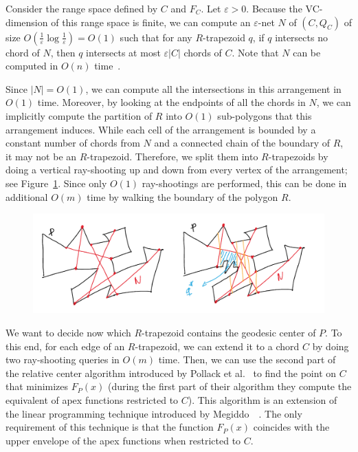 \documentclass[a4paper,UKenglish]{lipics}
\newcommand{\F}[2]{\ensuremath{F_{\scriptscriptstyle #1}(#2)}}
\begin{document}
Consider the range space defined by $C$ and $F_C$. 
Let $\varepsilon >0$.
Because the VC-dimension of this range space is finite, we can compute an $\varepsilon$-net $N$ of $(C, Q_C)$ of size $O(\frac{1}{\varepsilon} \log \frac{1}{\varepsilon}) = O(1)$ such that for any $R$-trapezoid $q$, if $q$ intersects no chord of $N$, then $q$ intersects at most $\varepsilon |C|$ chords of $C$. Note that $N$ can be computed in $O(n)$ time~\cite{ConstructionEpsilonNets}. 

Since $|N| = O(1)$, we can compute all the intersections in this arrangement in $O(1)$ time. 
Moreover, by looking at the endpoints of all the chords in $N$, 
we can implicitly compute the partition of $R$ into $O(1)$ sub-polygons that this arrangement induces.
While each cell of the arrangement is bounded by a constant number of chords from $N$ and a connected chain of the boundary of $R$, it may not be an $R$-trapezoid. Therefore, we split them into $R$-trapezoids by doing a vertical ray-shooting up and down from every vertex of the arrangement; see Figure~\ref{fig:Cutting of Chords}. 
Since only $O(1)$ ray-shootings are performed, this can be done in additional $O(m)$ time by walking the boundary of the polygon $R$.

\begin{figure}[tb]
\centering
\includegraphics[width=1\textwidth]{img/CuttingOfChords.pdf}
\caption{\small }
\label{fig:Cutting of Chords}
\end{figure}

We want to decide now which $R$-trapezoid contains the geodesic center of $P$. 
To this end, for each edge of an $R$-trapezoid, we can extend it to a chord $C$ by doing two ray-shooting queries in $O(m)$ time. Then, we can use the second part of the relative center algorithm introduced by Pollack et al.~\cite[Section~3]{pollackComputingCenter} to find the point on $C$ that minimizes $\F{P}{x}$ (during the first part of their algorithm they compute the equivalent of apex functions restricted to $C$).
This algorithm is an extension of the linear programming technique introduced by Megiddo~~\cite{megiddo1982linear}. 
The only requirement of this technique is that the function $\F{P}{x}$ coincides with the upper envelope of the apex functions when restricted to $C$.
\end{document}
